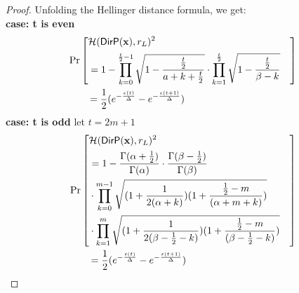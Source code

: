 \documentclass{article}
\begin{document}
\begin{proof}
Unfolding the Hellinger distance formula, we get:\\
  \noindent \textbf{case: t is even}
  \begin{align*}
  &\Pr\left[
\begin{aligned}\lefteqn{\hellinger(\bysinfer{\dataobs}, r_L )^2}\\
&= 1 - \prod_{k = 0}^{\frac{t}{2} - 1}
  \sqrt{1 - \frac{\frac{t}{2}}{a + k + \frac{t}{2}}}
  \cdot\prod_{k = 1}^{\frac{t}{2}}
  \sqrt{1 - \frac{\frac{t}{2}}{\beta - k}}
\end{aligned}
\right] \\
  &\qquad = \frac{1}{2} (e^{- \frac{\epsilon (t)}{\Delta }} - e^{- \frac{\epsilon (t + 1)}{\Delta }})
  \end{align*}
  \noindent \textbf{case: t is odd}
  let $t = 2 m + 1$
  \begin{align*}
  & \Pr\left[
  \begin{aligned}\lefteqn{\hellinger(\bysinfer{\dataobs}, r_L )^2} \\
  & =
  1 - \frac{\Gamma(\alpha+\frac{1}{2})}{\Gamma(\alpha)} \cdot
\frac{\Gamma(\beta - \frac{1}{2})}{\Gamma(\beta)}\\
&\cdot 
  \prod_{k = 0}^{m-1}
  \sqrt{(1 + \frac{1}{2(\alpha + k)})
  (1 + \frac{\frac{1}{2} - m}{(\alpha + m  + k)})
  }\\ &\cdot 
  \prod_{k = 1}^{m} 
  \sqrt{(1 + \frac{1}{2(\beta - \frac{1}{2}- k)})(1 + \frac{\frac{1}{2} - m}{(\beta - \frac{1}{2}- k)})} \end{aligned}
\right] \\
   &\qquad = \frac{1}{2} (e^{- \frac{\epsilon (t)}{\Delta }} - e^{- \frac{\epsilon (t + 1)}{\Delta }})
  \end{align*}

\end{proof}
\end{document}
